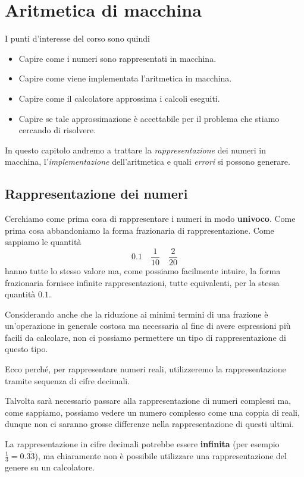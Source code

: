 \chapter{Aritmetica di macchina}
I punti d'interesse del corso sono quindi
\begin{itemize}
	\item Capire come i numeri sono rappresentati in macchina.
	\item Capire come viene implementata l'aritmetica in macchina.
	\item Capire come il calcolatore approssima i calcoli eseguiti.
	\item Capire se tale approssimazione è accettabile per il problema che stiamo cercando di risolvere.
\end{itemize}
In questo capitolo andremo a trattare la \emph{rappresentazione} dei numeri in macchina, l'\emph{implementazione}
dell'aritmetica e quali \emph{errori} si possono generare.

\section{Rappresentazione dei numeri}
Cerchiamo come prima cosa di rappresentare i numeri in modo \textbf{univoco}. Come prima cosa abbandoniamo la
forma frazionaria di rappresentazione. Come sappiamo le quantità
\[ 0.1 \quad \frac{1}{10} \quad \frac{2}{20} \]
hanno tutte lo stesso valore ma, come possiamo facilmente intuire, la forma frazionaria fornisce infinite
rappresentazioni, tutte equivalenti, per la stessa quantità $0.1$.

Considerando anche che la riduzione ai minimi termini di una frazione è un'operazione in generale costosa ma
necessaria al fine di avere espressioni più facili da calcolare, non ci possiamo permettere un tipo di
rappresentazione di questo tipo.

Ecco perché, per rappresentare numeri reali, utilizzeremo la rappresentazione tramite sequenza di cifre decimali.

\begin{observation}
	Talvolta sarà necessario passare alla rappresentazione di numeri complessi ma, come sappiamo, possiamo vedere
	un numero complesso come una coppia di reali, dunque non ci saranno grosse differenze nella rappresentazione
	di questi ultimi.
\end{observation}

\begin{observation}
	La rappresentazione in cifre decimali potrebbe essere \textbf{infinita} (per esempio
	$\frac{1}{3} = 0.\overline{33}$), ma chiaramente non è possibile utilizzare una rappresentazione del genere
	su un calcolatore.
\end{observation}


